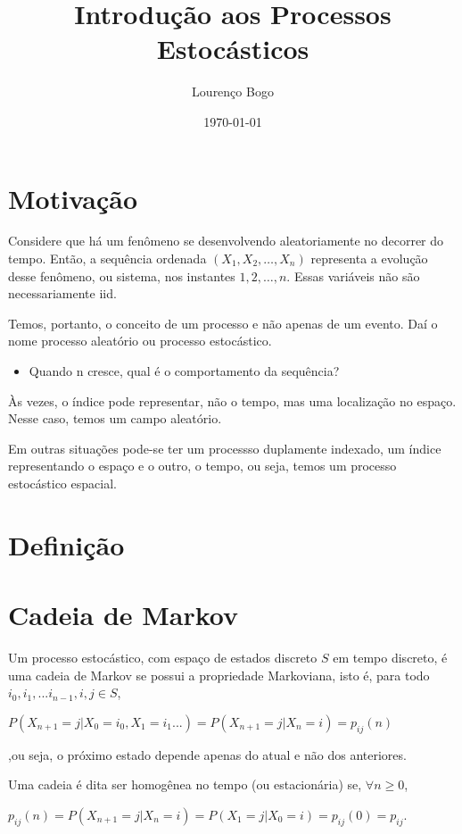 \documentclass[11pt]{article}
\author{Lourenço Bogo}
\date{\today}
\title{Introdução aos Processos Estocásticos}
\begin{document}
\maketitle

\section{Motivação}
\label{sec:orgdaba108}
Considere que há um fenômeno se desenvolvendo aleatoriamente no decorrer do tempo.
Então, a sequência ordenada \((X_1, X_2, \dots, X_n)\) representa a evolução desse fenômeno, ou sistema, nos instantes \(1, 2, \dots, n\).
Essas variáveis não são necessariamente iid.

Temos, portanto, o conceito de um processo e não apenas de um evento. Daí o nome processo aleatório ou processo estocástico.

\begin{itemize}
\item Quando n cresce, qual é o comportamento da sequência?
\end{itemize}

Às vezes, o índice pode representar, não o tempo, mas uma localização no espaço. Nesse caso, temos um campo aleatório.

Em outras situações pode-se ter um processso duplamente indexado, um índice representando o espaço e o outro, o tempo, ou seja, temos um processo estocástico espacial.

\section{Definição}
\label{sec:org32b8fed}
\section{Cadeia de Markov}
\label{sec:orgcba99a2}
Um processo estocástico, com espaço de estados discreto \(S\) em tempo discreto, é uma cadeia de Markov se possui a propriedade Markoviana, isto é, para todo \(i_0, i_1, ...i_{n-1}, i, j \in S\),

\(P(X_{n+1} = j | X_0 = i_0, X_1 = i_1 ...) = P(X_{n+1} = j | X_n = i) = p_{ij}(n)\)

,ou seja, o próximo estado depende apenas do atual e não dos anteriores.

Uma cadeia é dita ser homogênea no tempo (ou estacionária) se, \(\forall n \geq 0\),

\(p_{ij}(n) = P(X_{n+1} = j | X_n = i) = P(X_1 = j | X_0 = i) = p_{ij}(0) = p_{ij}\).
\end{document}
